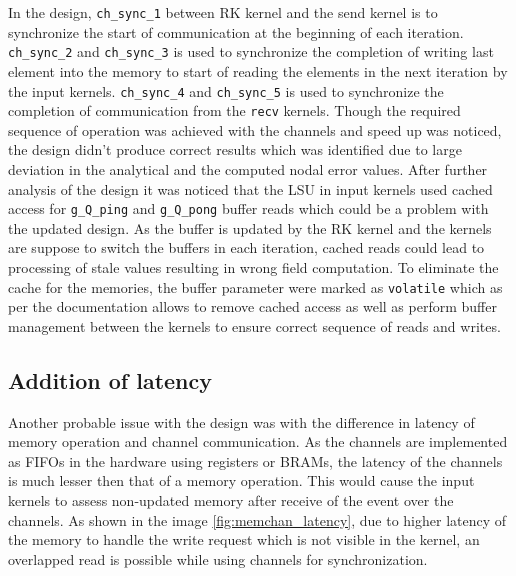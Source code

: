 In the design, \texttt{ch\_sync\_1} between RK kernel and the send kernel is to synchronize
the start of communication at the beginning of each iteration. \texttt{ch\_sync\_2} and
\texttt{ch\_sync\_3} is used to synchronize the completion of writing last element into
the memory to start of reading the elements in the next iteration by the input kernels.
\texttt{ch\_sync\_4} and \texttt{ch\_sync\_5} is used to synchronize the completion
of communication from the \texttt{recv} kernels. Though the required sequence of operation
was achieved with the channels and speed up was noticed, the design didn't produce correct
results which was identified due to large deviation in the analytical and the computed
nodal error values. After further analysis of the design it was noticed that the
\acl{LSU} in input kernels used cached access for \texttt{g\_Q\_ping} and \texttt{g\_Q\_pong}
buffer reads which could be a problem with the updated design. As the buffer is updated by the
RK kernel and the kernels are suppose to switch the buffers in each iteration, cached reads
could lead to processing of stale values resulting in wrong field computation. To eliminate
the cache for the memories, the buffer parameter were marked as \texttt{volatile} which
as per the documentation allows to remove cached access as well as perform buffer management 
between the kernels to ensure correct sequence of reads and writes.

\subsection*{Addition of latency}

Another probable issue with the design was with the difference in latency of memory operation
and channel communication. As the channels are implemented as FIFOs in the hardware
using registers or BRAMs, the latency of the channels is much lesser then that of a memory
operation. This would cause the input kernels to assess non-updated memory after receive of the
event over the channels. As shown in the image \ref{fig:memchan_latency}, due to higher latency
of the memory to handle the write request which is not visible in the kernel, an overlapped
read is possible while using channels for synchronization.

